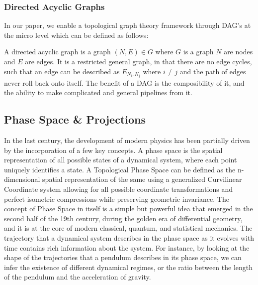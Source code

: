 \subsubsection{Directed Acyclic Graphs}
In our paper, we enable a topological graph theory framework through DAG's at the micro level which can be defined as follows:

A directed acyclic graph is a graph $(N,E) \in G$ where $G$ is a graph $N$ are nodes and $E$ are edges. It is a restricted general graph, in that there are no edge cycles, such that an edge can be described as $E_{N_i,N_j}$ where $i \ne j$ and the path of edges never roll back onto itself. The benefit of a DAG is the composibility of it, and the ability to make complicated and general pipelines from it.

\subsection{Phase Space \& Projections} 
\label{sec:phase_space}
In the last century, the development of modern physics has been partially driven by the incorporation of a few key concepts. A phase space is the spatial representation of all possible states of a dynamical system, where each point uniquely identifies a state. A Topological Phase Space can be defined as the n-dimensional spatial representation of the same using a generalized Curvilinear Coordinate system allowing for all possible coordinate transformations and perfect isometric compressions while preserving geometric invariance.
The concept of Phase Space in itself is a simple but powerful idea that emerged in the second half of the 19th century, during the golden era of differential geometry, and it is at the core of modern classical, quantum, and statistical mechanics. The trajectory that a dynamical system describes in the phase space as it evolves with time contains rich information about the system. For instance, by looking at the shape of the trajectories that a pendulum describes in its phase space, we can infer the existence of different dynamical regimes, or the ratio between the length of the pendulum and the acceleration of gravity.

